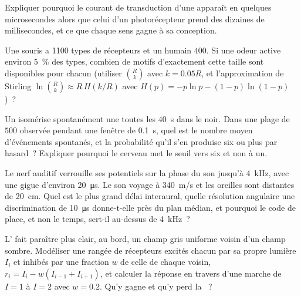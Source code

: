 \begin{exercise}[$\star\star$]\label{exo:b3:sensory-systems:8}
Expliquer pourquoi le courant de transduction d'une 
apparaît en quelques microsecondes alors que celui d'un photorécepteur
prend des dizaines de millisecondes, et ce que chaque sens gagne à sa
conception.
\end{exercise}

\begin{exercise}[$\star\star$]\label{exo:b3:sensory-systems:9}
Une souris a \num{1100} types de récepteurs et un humain $400$. Si une
odeur active environ \qty{5}{\%} des types, combien de motifs
d'exactement cette taille sont disponibles pour chacun (utiliser
$\binom{R}{k}$ avec $k = 0.05R$, et l'approximation de Stirling
$\ln\binom{R}{k} \approx R\,H(k/R)$ avec
$H(p) = -p\ln p - (1-p)\ln(1-p)$)~?
\end{exercise}

\begin{exercise}[$\star\star\star$]\label{exo:b3:sensory-systems:10}
Un  isomérise spontanément une  toutes les
\qty{40}{s} dans le noir. Dans une plage de $500$  observée
pendant une fenêtre de \qty{0.1}{s}, quel est le nombre moyen
d'événements spontanés, et la probabilité qu'il s'en produise six ou
plus par hasard~? Expliquer pourquoi le cerveau met le seuil vers six et
non à un.
\end{exercise}

\begin{exercise}[$\star\star\star$]\label{exo:b3:sensory-systems:11}
Le nerf auditif verrouille ses potentiels sur la phase du son jusqu'à
\qty{4}{kHz}, avec une gigue d'environ \qty{20}{\micro s}. Le son voyage
à \qty{340}{m/s} et les oreilles sont distantes de \qty{20}{cm}. Quel
est le plus grand délai interaural, quelle résolution angulaire une
discrimination de \qty{10}{\micro s} donne-t-elle près du plan médian,
et pourquoi le code de place, et non le temps, sert-il au-dessus de
\qty{4}{kHz}~?
\end{exercise}

\begin{exercise}[$\star\star\star$]\label{exo:b3:sensory-systems:12}
L' fait paraître plus clair, au bord, un champ gris
uniforme voisin d'un champ sombre. Modéliser une rangée de récepteurs
excités chacun par sa propre lumière $I_{i}$ et inhibés par une fraction
$w$ de celle de chaque voisin, $r_{i} = I_{i} - w(I_{i-1} + I_{i+1})$,
et calculer la réponse en travers d'une marche de $I = 1$ à $I = 2$ avec
$w = 0.2$. Qu'y gagne et qu'y perd la ~?
\end{exercise}

